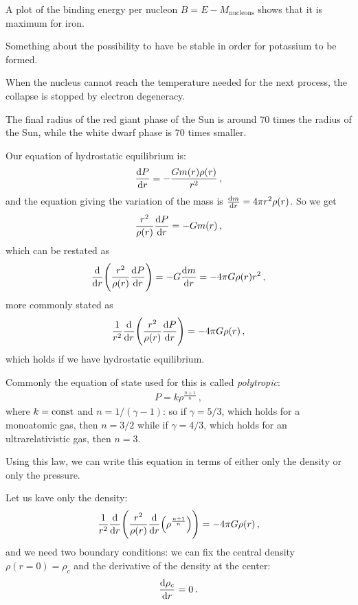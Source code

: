 \documentclass[main.tex]{subfiles}
\begin{document}
A plot of the binding energy per nucleon \(B = E - M _{\text{nucleons}}\) shows that it is maximum for iron. 

Something about the possibility to have  be stable in order for potassium to be formed. 

When the nucleus cannot reach the temperature needed for the next process, the collapse is stopped by electron degeneracy. 

The final radius of the red giant phase of the Sun is around \(70\) times the radius of the Sun, while the white dwarf phase is \(70\) times smaller. 

Our equation of hydrostatic equilibrium is:
%
\begin{align}
  \dv{P}{r} = - \frac{G m(r) \rho (r)}{r^2}
\,,
\end{align}
%
and the equation giving the variation of the mass is \(\dv{m}{r} = 4 \pi r^2 \rho (r)\).
So we get 
%
\begin{align}
  \frac{r^2}{\rho (r)} \dv{P}{r} = - G m(r)
\,,
\end{align}
%
which can be restated as 
%
\begin{align}
  \dv{}{r} \qty(\frac{r^2}{\rho (r)} \dv{P}{r}) = - G \dv{m}{r} = - 4 \pi G \rho (r) r^2
\,,
\end{align}
%
more commonly stated as 
%
\begin{align}
  \frac{1}{r^2} \dv{}{r} \qty(\frac{r^2}{\rho (r)} \dv{P}{r}) = -4 \pi G \rho (r)
\,,
\end{align}
%
which holds if we have hydrostatic equilibrium. 

Commonly the equation of state used for this is called \emph{polytropic}: 
%
\begin{align}
  P = k \rho^{\frac{n+1}{n}}
\,,
\end{align}
%
where \(k = \text{const}\) and \(n = 1/ (\gamma -1)\): so if \(\gamma = 5/3\), which holds for a monoatomic gas, then \(n = 3/2\) while if \(\gamma = 4/3\), which holds for an ultrarelativistic gas, then \(n = 3\). 

Using this law, we can write this equation in terms of either only the density or only the pressure. 

Let us kave only the density: 
%
\begin{align}
  \frac{1}{r^2} \dv{}{r} \qty(\frac{r^2}{\rho (r)} \dv{}{r} \qty(\rho^{\frac{n+1}{n}})) = - 4 \pi G \rho (r)
\,,
\end{align}
%
and we need two boundary conditions: we can fix the central density \(\rho(r=0) = \rho_c\) and the derivative of the density at the center: 
%
\begin{align}
  \dv{\rho_c}{r} (r=0) = 0
\,.
\end{align}
\end{document}

